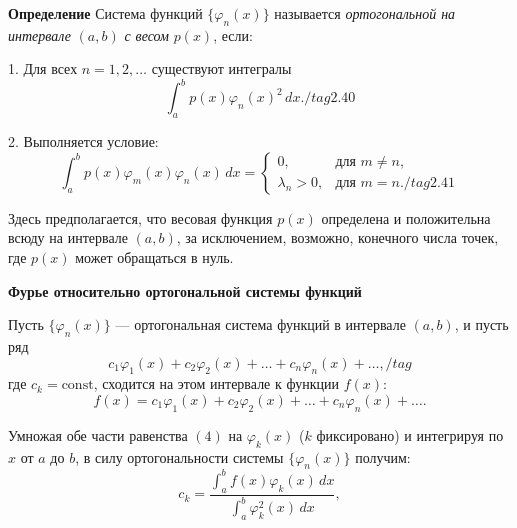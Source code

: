     \textbf{Определение}
    Система функций \(\{\varphi_n(x)\}\) называется \textit{ортогональной на интервале} \((a, b)\) \textit{с весом} \(p(x)\), если:
    
    1. Для всех \(n = 1, 2, \ldots\) существуют интегралы
    \[
    \int_a^b p(x) \varphi_n(x)^2 \, dx.     
    /tag{2.40}
    \]
    
    2. Выполняется условие:
    \[
    \int_a^b p(x) \varphi_m(x) \varphi_n(x) \, dx =
    \begin{cases} 
        0, & \text{для } m \neq n, \\
        \lambda_n > 0, & \text{для } m = n. /tag{2.41}
    \end{cases}
    \]
    
    Здесь предполагается, что весовая функция \(p(x)\) определена и положительна всюду на интервале \((a, b)\), за исключением, возможно, конечного числа точек, где \(p(x)\) может обращаться в нуль.


    \textbf {Фурье относительно ортогональной системы функций}

    Пусть \(\{\varphi_n(x)\}\) — ортогональная система функций в интервале \((a, b)\), и пусть ряд
    \[
    c_1 \varphi_1(x) + c_2 \varphi_2(x) + \ldots + c_n \varphi_n(x) + \ldots, /  tag{}
    \]
    где \(c_k = \text{const}\), сходится на этом интервале к функции \(f(x)\):
    \[
    f(x) = c_1 \varphi_1(x) + c_2 \varphi_2(x) + \ldots + c_n \varphi_n(x) + \ldots. \tag{2.42} 
    \]
    
    Умножая обе части равенства \((4)\) на \(\varphi_k(x)\) (\(k\) фиксировано) и интегрируя по \(x\) от \(a\) до \(b\), в силу ортогональности системы \(\{\varphi_n(x)\}\) получим:
    \[
    c_k = \frac{\int_a^b f(x) \varphi_k(x) \, dx}{\int_a^b \varphi_k^2(x) \, dx},  \tag{2.43}
    \]
  
   
   
    
